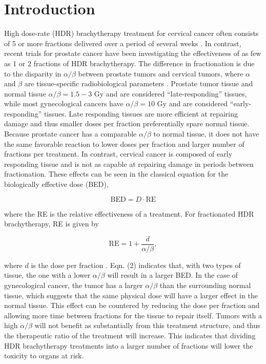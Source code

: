\documentclass[osajnl,twocolumn,showpacs,superscriptaddress,10pt]{revtex4-1}
\begin{document}
\maketitle



\section{Introduction}
High dose-rate (HDR) brachytherapy treatment for cervical cancer often consists of 5 or more fractions delivered over a period of several weeks \cite{cervicalfrac1, cervicalfrac2}. In contrast, recent trials for prostate cancer \cite{prostfrac1, prostfrac2, prostfrac3, prostfrac4} have been investigating the effectiveness of as few as 1 or 2 fractions of HDR brachytherapy. The difference in fractionation is due to the disparity in $\alpha/\beta$ between prostate tumors and cervical tumors, where $\alpha$ and $\beta$ are tissue-specific radiobiological parameters \cite{alphabeta}. Prostate tumor tissue and normal tissue $\alpha/\beta = 1.5-3$ Gy and are considered ``late-responding'' tissues, while most gynecological cancers have $\alpha/\beta = 10$ Gy and are considered ``early-responding'' tissues. Late responding tissues are more efficient at repairing damage and thus smaller doses per fraction preferentially spare normal tissue. Because prostate cancer has a comparable $\alpha/\beta$ to normal tissue, it does not have the same favorable reaction to lower doses per fraction and larger number of fractions per treatment. In contrast, cervical cancer is composed of early responding tissue and is not as capable at repairing damage in periods between fractionation. These effects can be seen in the classical equation for the biologically effective dose (BED), 

\begin{equation}\label{eq:BED}
    \text{BED} = D \cdot \text{RE}
\end{equation}

where the RE is the relative effectiveness of a treatment. For fractionated HDR brachytherapy, RE is given by

\begin{equation}\label{eq:RE}
    \text{RE} = 1 + \frac{d}{\alpha/\beta},
\end{equation}

where $d$ is the dose per fraction \cite{LQmodel}. Eqn. (2) indicates that, with two types of tissue, the one with a lower $\alpha/\beta$ will result in a larger BED. In the case of gynecological cancer, the tumor has a larger $\alpha/\beta$ than the surrounding normal tissue, which suggests that the same physical dose will have a larger effect in the normal tissue. This effect can be countered by reducing the dose per fraction and allowing more time between fractions for the tissue to repair itself. Tumors with a high $\alpha/\beta$ will not benefit as substantially from this treatment structure, and thus the therapeutic ratio of the treatment will increase. This indicates that dividing HDR brachytherapy treatments into a larger number of fractions will lower the toxicity to organs at risk. 
\end{document}

